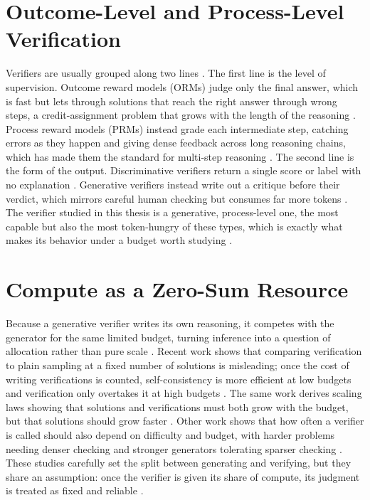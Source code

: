\documentclass[12pt, a4paper, oneside]{report}
\begin{document}
\section{Outcome-Level and Process-Level Verification}
Verifiers are usually grouped along two lines \parencite{Khalifa2025, Venktesh2025}. The first line is the level of supervision. Outcome reward models (ORMs) judge only the final answer, which is fast but lets through solutions that reach the right answer through wrong steps, a credit-assignment problem that grows with the length of the reasoning \parencite{Zhuang2026}. Process reward models (PRMs) instead grade each intermediate step, catching errors as they happen and giving dense feedback across long reasoning chains, which has made them the standard for multi-step reasoning \parencite{Khalifa2025}. The second line is the form of the output. Discriminative verifiers return a single score or label with no explanation \parencite{Singhi2025}. Generative verifiers instead write out a critique before their verdict, which mirrors careful human checking but consumes far more tokens \parencite{Khalifa2025, Zhang2025tts}. The verifier studied in this thesis is a generative, process-level one, the most capable but also the most token-hungry of these types, which is exactly what makes its behavior under a budget worth studying \parencite{Wang2025, Snell2024}.

\section{Compute as a Zero-Sum Resource}
Because a generative verifier writes its own reasoning, it competes with the generator for the same limited budget, turning inference into a question of allocation rather than pure scale \parencite{Singhi2025, Wang2025}. Recent work shows that comparing verification to plain sampling at a fixed number of solutions is misleading; once the cost of writing verifications is counted, self-consistency is more efficient at low budgets and verification only overtakes it at high budgets \parencite{Singhi2025}. The same work derives scaling laws showing that solutions and verifications must both grow with the budget, but that solutions should grow faster \parencite{Singhi2025}. Other work shows that how often a verifier is called should also depend on difficulty and budget, with harder problems needing denser checking and stronger generators tolerating sparser checking \parencite{Wang2025}. These studies carefully set the split between generating and verifying, but they share an assumption: once the verifier is given its share of compute, its judgment is treated as fixed and reliable \parencite{Singhi2025, Wang2025}.
\end{document}

